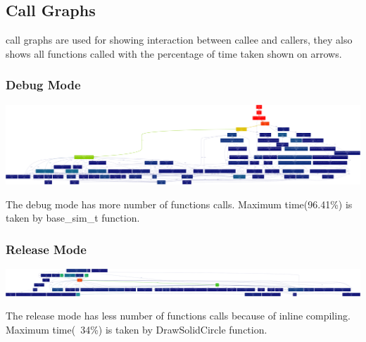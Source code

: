 \documentclass[11pt]{article}
\begin{document}
\subsection{Call Graphs}
call graphs are used for showing interaction between callee and callers, they also shows all functions called with the percentage of time taken shown on arrows.
\subsubsection{Debug Mode}
\begin{center}
\includegraphics[scale=0.06]{call_graph_debug}
\end{center}
The debug mode has more number of functions calls. Maximum time(96.41\%) is taken by base\_sim\_t function.
\subsubsection{Release Mode}
\begin{center}
\includegraphics[scale=0.06]{call_graph_release}
\end{center}
The release mode has less number of functions calls because of inline compiling. Maximum time(~34\%) is taken by DrawSolidCircle function.



\end{document}
